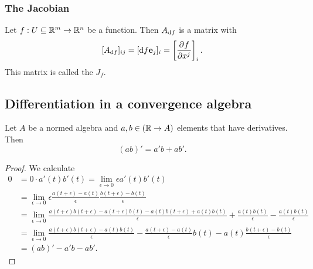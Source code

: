 \subsubsection{The Jacobian}
\begin{definition}
Let $f:U\subseteq\mathbb{R}^m\to\mathbb{R}^n$ be a function. Then $A_{\operatorname{d \!}{f}}$ is a matrix with
\[ [A_{\operatorname{d \!}{f}}]_{ij} = [\operatorname{d \!}{f}\boldsymbol{\mathrm{e}}_j]_i = \left[ \frac{\partial{^{}}f}{\partial{{x^j}^{}}} \right]_i. \]
This matrix is called the  $J_f$.
\end{definition}


\subsection{Differentiation in a convergence algebra}

\begin{proposition}
Let $A$ be a normed algebra and $a,b\in (\mathbb{R} \to A)$ elements that have derivatives. Then
\[ (ab)' = a'b + ab'. \]
\end{proposition}
\begin{proof}
We calculate
\begin{align*}
0 &= 0\cdot a'(t)b'(t) = \lim_{\epsilon \to 0} \epsilon a'(t)b'(t) \\
&= \lim_{\epsilon \to 0} \epsilon \frac{a(t+\epsilon) - a(t)}{\epsilon}\frac{b(t+\epsilon) - b(t)}{\epsilon} \\
&= \lim_{\epsilon \to 0}\frac{a(t+\epsilon)b(t+\epsilon) - a(t+\epsilon)b(t) - a(t)b(t+\epsilon) + a(t)b(t)}{\epsilon} + \frac{a(t)b(t)}{\epsilon} - \frac{a(t)b(t)}{\epsilon} \\
&= \lim_{\epsilon \to 0} \frac{a(t+\epsilon)b(t+\epsilon) - a(t)b(t)}{\epsilon} - \frac{a(t+\epsilon) - a(t)}{\epsilon}b(t) - a(t)\frac{b(t+\epsilon) - b(t)}{\epsilon} \\
&= (ab)' - a'b - ab'.
\end{align*}
\end{proof}


